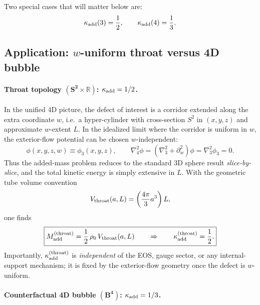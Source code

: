 \documentclass[11pt]{article}
\begin{document}
Two special cases that will matter below are:
\begin{equation}
  \kappa_{\rm add}(3)=\frac12,\qquad
  \kappa_{\rm add}(4)=\frac13.
\end{equation}

\subsection{Application: \texorpdfstring{\(w\)}{w}-uniform throat versus 4D bubble}

\paragraph{Throat topology \texorpdfstring{\(\boldsymbol{(S^2\times \mathbb R)}\)}{(S2 x R)}: \texorpdfstring{\(\kappa_{\rm add}=1/2\)}{kappa add = 1/2}.}

In the unified 4D picture, the defect of interest is a corridor extended along the extra coordinate \(w\), i.e.\ a hyper-cylinder with cross-section \(S^2\) in \((x,y,z)\) and approximate \(w\)-extent \(L\).  In the idealized limit where the corridor is uniform in \(w\), the exterior-flow potential can be chosen \(w\)-independent:
\begin{equation}
  \phi(x,y,z,w)\equiv \phi_3(x,y,z),
  \qquad
  \nabla_4^2\phi = (\nabla_3^2 + \partial_w^2)\phi
  = \nabla_3^2\phi_3 = 0.
\end{equation}
Thus the added-mass problem reduces to the standard 3D sphere result \emph{slice-by-slice}, and the total kinetic energy is simply extensive in \(L\). With the geometric tube volume convention
\begin{equation}
  V_{\rm throat}(a,L) = \left(\frac{4\pi}{3}a^3\right)L,
\end{equation}
one finds
\begin{equation}
  \boxed{
  M_{\rm add}^{\rm(throat)}
  = \frac12\,\rho_0\,V_{\rm throat}(a,L)
  \qquad\Rightarrow\qquad
  \kappa_{\rm add}^{\rm(throat)}=\frac12.
  }
\end{equation}
Importantly, \(\kappa_{\rm add}^{\rm(throat)}\) is \emph{independent} of the EOS, gauge sector, or any internal-support mechanism; it is fixed by the exterior-flow geometry once the defect is \(w\)-uniform.

\paragraph{Counterfactual 4D bubble \texorpdfstring{\(\boldsymbol{(B^4)}\)}{(B4)}: \texorpdfstring{\(\kappa_{\rm add}=1/3\)}{kappa add = 1/3}.}
\end{document}

